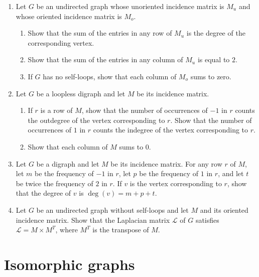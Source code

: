\begin{enumerate}
\item Let $G$ be an undirected graph whose unoriented incidence matrix
  is $M_u$ and whose oriented incidence matrix is $M_o$.
  \begin{enumerate}
  \item Show that the sum of the entries in any row of $M_u$ is the
    degree of the corresponding vertex.

  \item Show that the sum of the entries in any column of $M_u$ is
    equal to $2$.

  \item If $G$ has no self-loops, show that each column of $M_o$ sums
    to zero.
  \end{enumerate}

\item Let $G$ be a loopless digraph and let $M$ be its incidence
  matrix.
  \begin{enumerate}
  \item If $r$ is a row of $M$, show that the number of occurrences of
    $-1$ in $r$ counts the outdegree of the vertex corresponding to
    $r$. Show that the number of occurrences of $1$ in $r$ counts the
    indegree of the vertex corresponding to $r$.

  \item Show that each column of $M$ sums to $0$.
  \end{enumerate}

\item Let $G$ be a digraph and let $M$ be its incidence matrix. For
  any row $r$ of $M$, let $m$ be the frequency of $-1$ in $r$, let
  $p$ be the frequency of $1$ in $r$, and let $t$ be twice the
  frequency of $2$ in $r$. If $v$ is the vertex corresponding to
  $r$, show that the degree of $v$ is $\deg(v) = m + p + t$.

\item Let $G$ be an undirected graph without self-loops and let $M$
  and its oriented incidence matrix. Show that the Laplacian matrix
  $\mathcal{L}$ of $G$ satisfies $\mathcal{L} = M \times M^T$, where
  $M^T$ is the transpose of $M$.
\end{enumerate}



\section{Isomorphic graphs}

